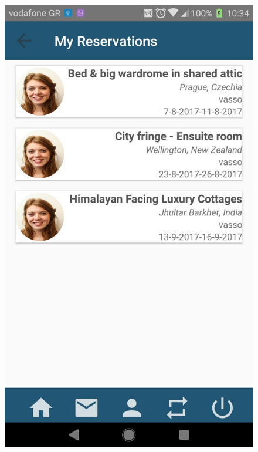 \documentclass[12pt]{article}
\begin{document}
	\begin{figure} [H]
		\begin{center}
			\includegraphics [scale = 0.18] {20-reservations.jpg}

\end{center}
\end{figure}
\end{document}
